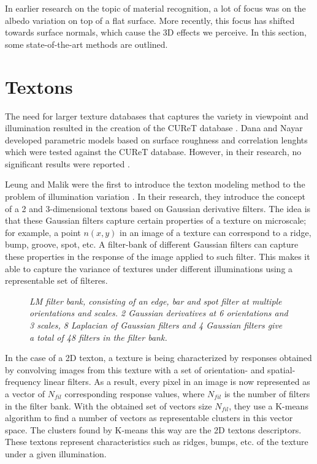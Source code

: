 \hypertarget{RelatedWork}{
}
In earlier research on the topic of material recognition, a lot of focus was on the albedo variation on top of a flat surface. More recently, this focus has shifted towards surface normals, which cause the 3D effects we perceive. In this section, some state-of-the-art methods are outlined.

\section{Textons}\label{sec:Textons}

The need for larger texture databases that captures the variety in viewpoint and illumination resulted in the creation of the CUReT database \cite{DanaNayar}. Dana and Nayar developed parametric models based on surface roughness and correlation lenghts which were tested against the CUReT database. However, in their research, no significant results were reported \cite{VarmaZisserman}.

Leung and Malik were the first to introduce the texton modeling method to the problem of illumination variation \cite{LeungMalik}. In their research, they introduce the concept of a 2 and 3-dimensional textons based on Gaussian derivative filters. The idea is that these Gaussian filters capture certain properties of a texture on microscale; for example, a point $n(x,y)$ in an image of a texture can correspond to a ridge, bump, groove, spot, etc. A filter-bank of different Gaussian filters can capture these properties in the response of the image applied to such filter. This makes it able to capture the variance of textures under different illuminations using a representable set of filteres.

\begin{figure}[b]
	\begin{center}
	\end{center}
	\caption{\textit{LM filter bank, consisting of an edge, bar and spot filter at multiple orientations and scales. 2 Gaussian derivatives at 6 orientations and 3 scales, 8 Laplacian of Gaussian filters and 4 Gaussian filters give a total of 48 filters in the filter bank.}}
	\label{fig:LM}
\end{figure}


In the case of a 2D texton, a texture is being characterized by responses obtained by convolving images from this texture with a set of orientation- and spatial-frequency linear filters. As a result, every pixel in an image is now represented as a vector of $N_{fil}$ corresponding response values, where $N_{fil}$ is the number of filters in the filter bank. With the obtained set of vectors size $N_{fil}$, they use a K-means algorithm to find a number of vectors as representable clusters in this vector space. The clusters found by K-means this way are the 2D textons descriptors. These textons represent characteristics such as ridges, bumps, etc. of the texture under a given illumination.

